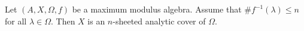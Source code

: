 
Let $(A, X, \Omega, f)$ be a maximum modulus algebra. Assume that $\#f^{-1}(\lambda) \leq n$ for all $\lambda \in \Omega$. Then $X$ is an $n$-sheeted analytic cover of $\Omega$.
